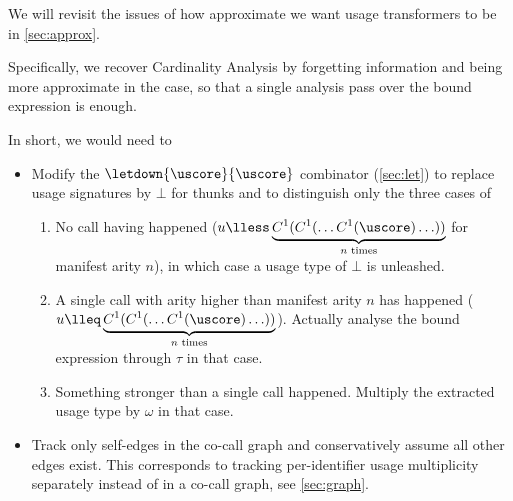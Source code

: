 We will revisit the issues of how approximate we want usage transformers to be in \cref{sec:approx}.

Specifically, we recover Cardinality Analysis by forgetting information and being more approximate in the  case, so that a single analysis pass over the bound expression is enough.

In short, we would need to

\begin{itemize}
  \item Modify the $\letdown{\uscore}{\uscore}$ combinator (\cf \cref{sec:let}) to replace usage signatures by $\bot$ for thunks and to distinguish only the three cases of 
    \begin{enumerate}
      \item No call having happened ($u \lless \underbrace{C^1(C^1(\ldots C^1(\uscore)\ldots))}_{n \text{~times}}$ for manifest arity $n$), in which case a usage type of $\bot$ is unleashed.
      \item A single call with arity higher than manifest arity $n$ has happened ($u\lleq\underbrace{C^1(C^1(\ldots C^1(\uscore)\ldots))}_{n \text{~times}}$). Actually analyse the bound expression through $\tau$ in that case.
      \item Something stronger than a single call happened. Multiply the extracted usage type by $\omega$ in that case.
    \end{enumerate}
  \item Track only self-edges in the co-call graph and conservatively assume all other edges exist. This corresponds to tracking per-identifier usage multiplicity separately instead of in a co-call graph, see \cref{sec:graph}.
\end{itemize}


